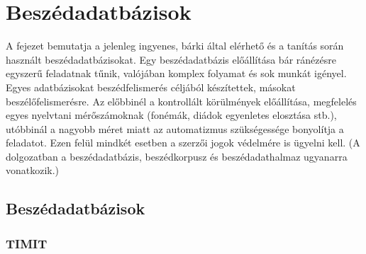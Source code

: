 \chapter{Beszédadatbázisok}

A fejezet bemutatja a jelenleg ingyenes, bárki által elérhető és a tanítás során használt beszédadatbázisokat. Egy beszédadatbázis előállítása bár ránézésre egyszerű feladatnak tűnik,
valójában komplex folyamat és sok munkát igényel. Egyes adatbázisokat beszédfelismerés céljából készítettek, másokat beszélőfelismerésre. Az előbbinél a kontrollált körülmények előállítása, megfelelés egyes nyelvtani mérőszámoknak (fonémák, diádok egyenletes elosztása stb.), utóbbinál a nagyobb méret miatt az automatizmus szükségessége bonyolítja a feladatot. Ezen felül mindkét esetben a szerzői jogok védelmére is ügyelni kell. (A dolgozatban a beszédadatbázis, beszédkorpusz és beszédadathalmaz ugyanarra vonatkozik.)

\section{Beszédadatbázisok}

\subsection{TIMIT}

